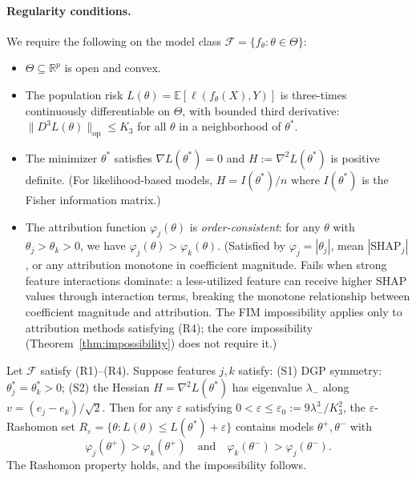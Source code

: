 \documentclass{jmlr}
\newcommand{\R}{\mathbb{R}}
\newcommand{\E}{\mathbb{E}}
\begin{document}
\paragraph{Regularity conditions.}
We require the following on the model class $\mathcal{F} = \{f_\theta : \theta \in \Theta\}$:
\begin{itemize}
    \item[\textbf{(R1)}] $\Theta \subseteq \R^p$ is open and convex.
    \item[\textbf{(R2)}] The population risk $L(\theta) = \E[\ell(f_\theta(X), Y)]$ is three-times continuously differentiable on $\Theta$, with bounded third derivative: $\|D^3 L(\theta)\|_{\text{op}} \leq K_3$ for all $\theta$ in a neighborhood of $\theta^*$.
    \item[\textbf{(R3)}] The minimizer $\theta^*$ satisfies $\nabla L(\theta^*) = 0$ and $H := \nabla^2 L(\theta^*)$ is positive definite. (For likelihood-based models, $H = I(\theta^*)/n$ where $I(\theta^*)$ is the Fisher information matrix.)
    \item[\textbf{(R4)}] The attribution function $\varphi_j(\theta)$ is \emph{order-consistent}: for any $\theta$ with $\theta_j > \theta_k > 0$, we have $\varphi_j(\theta) > \varphi_k(\theta)$. (Satisfied by $\varphi_j = |\theta_j|$, mean $|\text{SHAP}_j|$, or any attribution monotone in coefficient magnitude. Fails when strong feature interactions dominate: a less-utilized feature can receive higher SHAP values through interaction terms, breaking the monotone relationship between coefficient magnitude and attribution. The FIM impossibility applies only to attribution methods satisfying (R4); the core impossibility (Theorem~\ref{thm:impossibility}) does not require it.)
\end{itemize}

\begin{theorem}
\label{thm:fim-impossibility}
Let $\mathcal{F}$ satisfy (R1)--(R4). Suppose features $j, k$ satisfy: (S1) DGP symmetry: $\theta^*_j = \theta^*_k > 0$; (S2) the Hessian $H = \nabla^2 L(\theta^*)$ has eigenvalue $\lambda_-$ along $v = (e_j - e_k)/\sqrt{2}$. Then for any $\varepsilon$ satisfying $0 < \varepsilon \leq \varepsilon_0 := 9\lambda_-^3/K_3^2$, the $\varepsilon$-Rashomon set $R_\varepsilon = \{\theta : L(\theta) \leq L(\theta^*) + \varepsilon\}$ contains models $\theta^+, \theta^-$ with
\[
    \varphi_j(\theta^+) > \varphi_k(\theta^+) \quad\text{and}\quad \varphi_k(\theta^-) > \varphi_j(\theta^-).
\]
The Rashomon property holds, and the impossibility follows.
\end{theorem}
\end{document}

